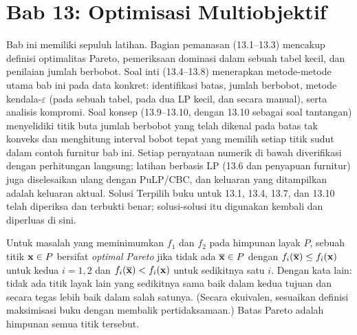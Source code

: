 
\section{Bab 13: Optimisasi Multiobjektif}

Bab ini memiliki sepuluh latihan. Bagian pemanasan (13.1--13.3) mencakup
definisi optimalitas Pareto, pemeriksaan dominasi dalam sebuah tabel kecil, dan
penilaian jumlah berbobot. Soal inti (13.4--13.8) menerapkan metode-metode utama
bab ini pada data konkret: identifikasi batas, jumlah berbobot, metode
kendala-$\varepsilon$ (pada sebuah tabel, pada dua LP kecil, dan secara manual),
serta analisis kompromi. Soal konsep (13.9--13.10, dengan 13.10 sebagai soal
tantangan) menyelidiki titik buta jumlah berbobot yang telah dikenal pada batas
tak konveks dan menghitung interval bobot tepat yang memilih setiap titik sudut
dalam contoh furnitur bab ini. Setiap pernyataan numerik di bawah diverifikasi
dengan perhitungan langsung; latihan berbasis LP (13.6 dan penyapuan furnitur)
juga diselesaikan ulang dengan PuLP/CBC, dan keluaran yang ditampilkan adalah
keluaran aktual. Solusi Terpilih buku untuk 13.1, 13.4, 13.7, dan 13.10 telah
diperiksa dan terbukti benar; solusi-solusi itu digunakan kembali dan diperluas
di sini.


Untuk masalah yang meminimumkan $f_1$ dan $f_2$ pada himpunan layak $P$, sebuah
titik $\mathbf{x} \in P$ bersifat \emph{optimal Pareto} jika tidak ada
$\overline{\mathbf{x}} \in P$ dengan $f_i(\overline{\mathbf{x}}) \leq f_i(\mathbf{x})$ untuk kedua
$i = 1, 2$ dan $f_i(\overline{\mathbf{x}}) < f_i(\mathbf{x})$ untuk sedikitnya satu $i$.
Dengan kata lain: tidak ada titik layak lain yang sedikitnya sama baik dalam
kedua tujuan dan secara tegas lebih baik dalam salah satunya. (Secara ekuivalen,
sesuaikan definisi maksimisasi buku dengan membalik pertidaksamaan.) Batas
Pareto adalah himpunan semua titik tersebut.

